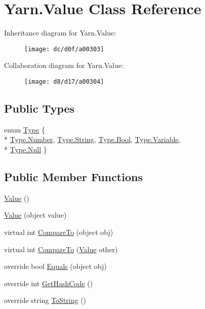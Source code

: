 \hypertarget{a00086}{\section{Yarn.\-Value Class Reference}
\label{a00086}
}


Inheritance diagram for Yarn.\-Value\-:
\nopagebreak
\begin{figure}[H]
\begin{center}
\leavevmode
\texttt{[image: dc/d0f/a00303]}
\end{center}
\end{figure}


Collaboration diagram for Yarn.\-Value\-:
\nopagebreak
\begin{figure}[H]
\begin{center}
\leavevmode
\texttt{[image: d8/d17/a00304]}
\end{center}
\end{figure}
\subsection*{Public Types}
\begin{DoxyCompactItemize}
\item 
enum \hyperlink{a00086_ad5aaf60ee4504608fcc2ffadefa14884}{Type} \{ \\*
\hyperlink{a00086_ad5aaf60ee4504608fcc2ffadefa14884ab2ee912b91d69b435159c7c3f6df7f5f}{Type.\-Number}, 
\hyperlink{a00086_ad5aaf60ee4504608fcc2ffadefa14884a27118326006d3829667a400ad23d5d98}{Type.\-String}, 
\hyperlink{a00086_ad5aaf60ee4504608fcc2ffadefa14884ac26f15e86e3de4c398a8273272aba034}{Type.\-Bool}, 
\hyperlink{a00086_ad5aaf60ee4504608fcc2ffadefa14884a47c14840d8e15331fa420b9b2f757cd9}{Type.\-Variable}, 
\\*
\hyperlink{a00086_ad5aaf60ee4504608fcc2ffadefa14884abbb93ef26e3c101ff11cdd21cab08a94}{Type.\-Null}
 \}
\end{DoxyCompactItemize}
\subsection*{Public Member Functions}
\begin{DoxyCompactItemize}
\item 
\hyperlink{a00086_a7d2db75682c57463bf43c13499991ad4}{Value} ()
\item 
\hyperlink{a00086_a960a015e35ea66270fe2713f39490e09}{Value} (object value)
\item 
virtual int \hyperlink{a00086_abf4dccca577017dff90912c01024ff6a}{Compare\-To} (object obj)
\item 
virtual int \hyperlink{a00086_a66de8cb38561c6589f01ca667267f4c6}{Compare\-To} (\hyperlink{a00086}{Value} other)
\item 
override bool \hyperlink{a00086_a5f4e343c2a82ddca84008ac7d155071d}{Equals} (object obj)
\item 
override int \hyperlink{a00086_a4c8412105c2ed3058bddac30ecf49916}{Get\-Hash\-Code} ()
\item 
override string \hyperlink{a00086_a70460d2f12485c8b980d75ad178e180b}{To\-String} ()
\end{DoxyCompactItemize}
